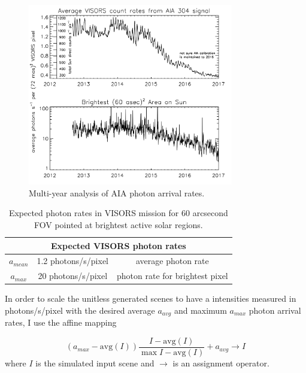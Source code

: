 \documentclass[tocnosub,noragright,centerchapter,12pt]{uiucecethesis09}
\begin{document}
\begin{figure}
  \centering
  \includegraphics[width=0.8\textwidth]{figures/daw.png}
  \caption{Multi-year analysis of AIA photon arrival rates.}
  \label{fig:daw}
\end{figure}

\begin{table}
  \begin{center}
    \begin{tabular}{|c|c|c|}
      \hline
      \multicolumn{3}{|c|}{Expected VISORS photon rates} \\
      \hline
      $a_{mean}$ & 1.2 photons/s/pixel & average photon rate \\
      $a_{max}$ & 20 photons/s/pixel  & photon rate for brightest pixel \\
      \hline
    \end{tabular}
    \caption{Expected photon rates in VISORS mission for 60 arcsecond FOV pointed at brightest active solar regions.}
    \label{tab:daw}
  \end{center}
\end{table}

In order to scale the unitless generated scenes to have a intensities measured in photons/s/pixel with the desired average $a_{avg}$ and maximum $a_{max}$ photon arrival rates, I use the affine mapping

$$ \left(a_{max} - \text{avg}(I)\right) \frac{I - \text{avg}(I)}{\max I - \text{avg}(I)} + a_{avg}\rightarrow I $$
where $I$ is the simulated input scene and $\rightarrow$ is an assignment operator.
\end{document}
